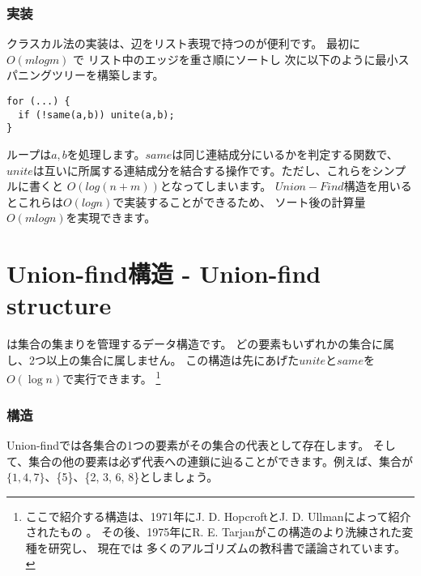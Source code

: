 \subsubsection{実装}

クラスカル法の実装は、辺をリスト表現で持つのが便利です。
最初に$O(m log m)$ で リスト中のエッジを重さ順にソートし
次に以下のように最小スパニングツリーを構築します。

\begin{lstlisting}
for (...) {
  if (!same(a,b)) unite(a,b);
}
\end{lstlisting}

ループは$a,b$を処理します。$same$は同じ連結成分にいるかを判定する関数で、
$unite$は互いに所属する連結成分を結合する操作です。ただし、これらをシンプルに書くと
$O(log(n+m))$となってしまいます。
$Union-Find$構造を用いるとこれらは$O(log n)$で実装することができるため、
ソート後の計算量$O(m log n)$を実現できます。

\section{Union-find構造 - Union-find structure}


 は集合の集まりを管理するデータ構造です。
どの要素もいずれかの集合に属し、2つ以上の集合に属しません。
この構造は先にあげた$unite$と$same$を$O(\log n)$で実行できます。
\footnote{ ここで紹介する構造は、1971年にJ. D. HopcroftとJ. D. Ullmanによって紹介されたもの \cite{hop71}。
その後、1975年にR. E. Tarjanがこの構造のより洗練された変種を研究し\cite{tar75}、
現在では 多くのアルゴリズムの教科書で議論されています。}

\subsubsection{構造}

Union-findでは各集合の1つの要素がその集合の代表として存在します。
そして、集合の他の要素は必ず代表への連鎖に辿ることができます。例えば、集合が$\{1, 4, 7\}$、\{5\}、\{2, 3, 6, 8\}としましょう。

